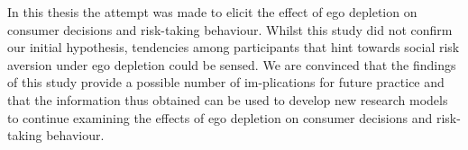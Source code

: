 In this thesis the attempt was made to elicit the effect of ego depletion on consumer decisions and risk-taking behaviour. Whilst this study did not confirm our initial hypothesis, tendencies among participants that hint towards social risk aversion under ego depletion could be sensed. We are convinced that the findings of this study provide a possible number of im-plications for future practice and that the information thus obtained can be used to develop new research models to continue examining the effects of ego depletion on consumer decisions and risk-taking behaviour.\par
